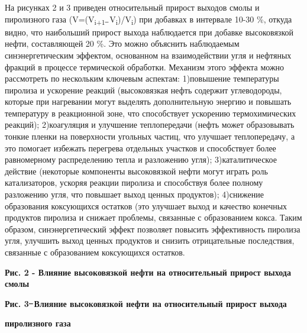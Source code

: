 На рисунках 2 и 3 приведен относительный прирост выходов смолы и
пиролизного газа (V=(V\textsubscript{i+1 ̶}
V\textsubscript{i})/V\textsubscript{i}) при добавках в интервале 10-30
\%, откуда видно, что наибольший прирост выхода наблюдается при добавке
высоковязкой нефти, составляющей 20 \%. Это можно объяснить наблюдаемым
синэнергетическим эффектом, основанном на взаимодействии угля и нефтяных
фракций в процессе термической обработки. Механизм этого эффекта можно
рассмотреть по нескольким ключевым аспектам: 1)повышение температуры
пиролиза и ускорение реакций (высоковязкая нефть содержит углеводороды,
которые при нагревании могут выделять дополнительную энергию и повышать
температуру в реакционной зоне, что способствует ускорению
термохимических реакций); 2)коагуляция и улучшение теплопередачи (нефть
может образовывать тонкие пленки на поверхности угольных частиц, что
улучшает теплопередачу, а это помогает избежать перегрева отдельных
участков и способствует более равномерному распределению тепла и
разложению угля); 3)каталитическое действие (некоторые компоненты
высоковязкой нефти могут играть роль катализаторов, ускоряя реакции
пиролиза и способствуя более полному разложению угля, что повышает выход
ценных продуктов); 4)снижение образования коксующихся остатков (это
улучшает выход и качество конечных продуктов пиролиза и снижает
проблемы, связанные с образованием кокса. Таким образом,
синэнергетический эффект позволяет повысить эффективность пиролиза угля,
улучшить выход ценных продуктов и снизить отрицательные последствия,
связанные с образованием коксующихся остатков.

{\bfseries Рис. 2 - Влияние высоковязкой нефти на относительный прирост
выхода смолы}

{\bfseries Рис. 3 ̶ Влияние высоковязкой нефти на относительный прирост
выхода}

{\bfseries пиролизного газа}

